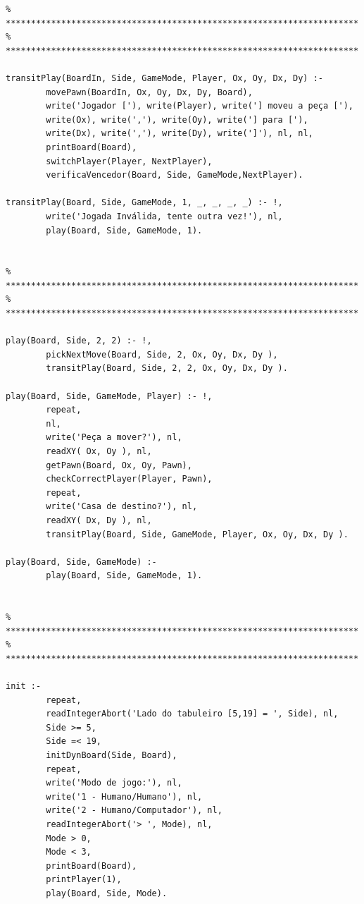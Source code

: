 \documentclass[15pt,a4paper]{article}
\begin{document}
\begin{lstlisting}
% **********************************************************************
% **********************************************************************

transitPlay(BoardIn, Side, GameMode, Player, Ox, Oy, Dx, Dy) :-
		movePawn(BoardIn, Ox, Oy, Dx, Dy, Board),
		write('Jogador ['), write(Player), write('] moveu a peça ['),
		write(Ox), write(','), write(Oy), write('] para ['),
		write(Dx), write(','), write(Dy), write(']'), nl, nl,
		printBoard(Board),
		switchPlayer(Player, NextPlayer),
		verificaVencedor(Board, Side, GameMode,NextPlayer).

transitPlay(Board, Side, GameMode, 1, _, _, _, _) :- !,
		write('Jogada Inválida, tente outra vez!'), nl,
		play(Board, Side, GameMode, 1).


% **********************************************************************
% **********************************************************************

play(Board, Side, 2, 2) :- !,
		pickNextMove(Board, Side, 2, Ox, Oy, Dx, Dy ),
		transitPlay(Board, Side, 2, 2, Ox, Oy, Dx, Dy ).

play(Board, Side, GameMode, Player) :- !,
		repeat,
		nl,
		write('Peça a mover?'), nl,
		readXY( Ox, Oy ), nl,
		getPawn(Board, Ox, Oy, Pawn),
		checkCorrectPlayer(Player, Pawn),
		repeat,
		write('Casa de destino?'), nl,	
		readXY( Dx, Dy ), nl,
		transitPlay(Board, Side, GameMode, Player, Ox, Oy, Dx, Dy ).
	
play(Board, Side, GameMode) :-
		play(Board, Side, GameMode, 1).


% **********************************************************************
% **********************************************************************
	
init :-
		repeat,
		readIntegerAbort('Lado do tabuleiro [5,19] = ', Side), nl,
		Side >= 5,
		Side =< 19,
		initDynBoard(Side, Board),
		repeat,
		write('Modo de jogo:'), nl,
		write('1 - Humano/Humano'), nl,
		write('2 - Humano/Computador'), nl,
		readIntegerAbort('> ', Mode), nl,
		Mode > 0,
		Mode < 3,
		printBoard(Board),
		printPlayer(1),
		play(Board, Side, Mode).


\end{lstlisting}
\end{document}
